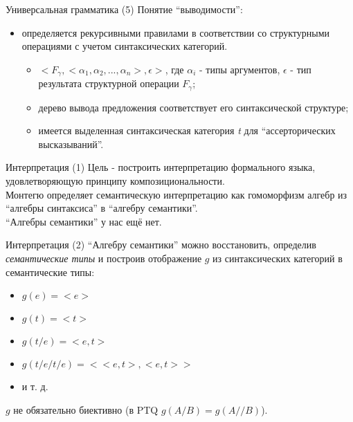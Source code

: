 \documentclass{beamer}
\begin{document}
\begin{frame}{Универсальная грамматика (5)}
Понятие ``выводимости'':\\
\begin{itemize}
  \item определяется рекурсивными правилами в соответствии со структурными операциями с учетом синтаксических категорий.
    \begin{itemize}
      \item $< \! F_\gamma, < \! \alpha_1, \alpha_2, ... , \alpha_n \! >, \epsilon \!>$, где $\alpha_i$ - типы аргументов, $\epsilon$ - тип результата структурной операции $F_\gamma$;
      \item дерево вывода предложения соответствует его синтаксической структуре;
      \item имеется выделенная синтаксическая категория \textit{t} для ``ассерторических высказываний''.
    \end{itemize}
\end{itemize}
\end{frame}

\begin{frame}{Интерпретация (1)}
Цель - построить интерпретацию формального языка, удовлетворяющую принципу композициональности.\\
\bigskip
Монтегю определяет семантическую интерпретацию как гомоморфизм алгебр из ``алгебры синтаксиса'' в ``алгебру семантики''.\\
\bigskip
``Алгебры семантики'' у нас ещё нет.
\end{frame}

\begin{frame}{Интерпретация (2)}
``Алгебру семантики'' можно восстановить, определив \textit{семантические типы} и построив 
отображение $g$ из синтаксических категорий в семантические типы:\\
\bigskip
\begin{itemize}
  \item $g(e) = < \! e \! >$
  \item $g(t) = < \! t \! >$
  \item $g(t/e) = < \! e, t \! >$
  \item $g(t/e/t/e) = < \! < \! e, t \! >, < \! e, t \! > \! >$
  \item и т. д.
\end{itemize}
\bigskip
$g$ не обязательно биективно (в PTQ $g(A/B) = g(A//B)$).
\end{frame}
\end{document}
